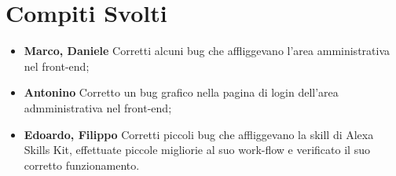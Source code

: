 \documentclass[../verbale-2017-05-10.tex]{subfiles}
\begin{document}
	\section{Compiti Svolti}
		\begin{itemize}
			\item \textbf{Marco, Daniele} Corretti alcuni bug che affliggevano l'area amministrativa nel front-end;
			\item \textbf{Antonino} Corretto un bug grafico nella pagina di login dell'area admministrativa nel front-end;
			\item \textbf{Edoardo, Filippo} Corretti piccoli bug che affliggevano la skill di Alexa Skills Kit, effettuate piccole migliorie al suo work-flow e verificato il suo corretto funzionamento.
		\end{itemize}
\end{document}
